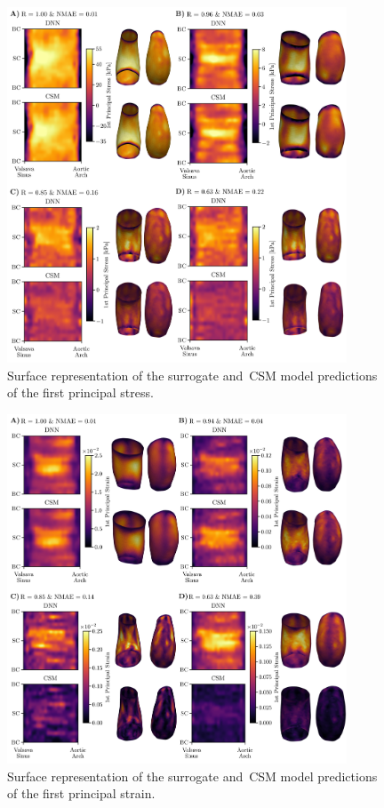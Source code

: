\documentclass[a4paper,fleqn]{cas-sc}
\begin{document}
    \begin{figure}
      \centering
      \includegraphics[width=0.9\textwidth]{fig4}
      \caption{Surface representation of the surrogate and~\gls{CSM} model predictions of the first principal stress.}
      \label{fig:surface_representationStress}
    \end{figure}    

    \begin{figure}
      \centering
      \includegraphics[width=0.9\textwidth]{fig5}
      \caption{Surface representation of the surrogate and~\gls{CSM} model predictions of the first principal strain.}
      \label{fig:surface_representationStrain}
    \end{figure}
      
\end{document}
